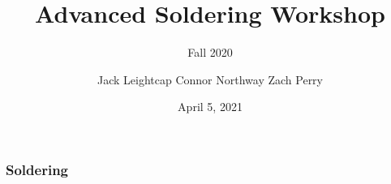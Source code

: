 \documentclass{beamer} \usetheme{Madrid}
\title{Advanced Soldering Workshop}
\subtitle{Fall 2020}
\author[]{Jack Leightcap\inst{1}\inst{2}
	Connor Northway\inst{2}
	Zach Perry\inst{2}}
\institute[IEEE, Wireless Club]{
	\inst{1}IEEE -- \url{nuieeeofficers@gmail.com}
	\and
	\inst{2}Wireless Club -- \url{nuwirelessclub@gmail.com}
}
\date[Fall 2020]{April 5, 2021}
\begin{document}
\frame{\titlepage}

\begin{frame}
	\frametitle{Soldering}
\end{frame}
\end{document}

